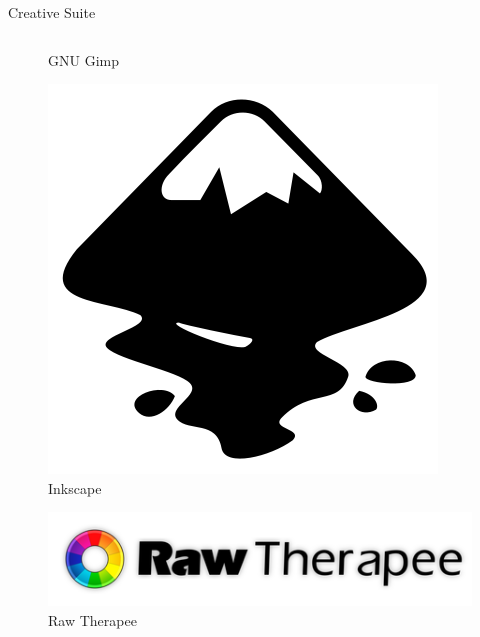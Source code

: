 \documentclass[10pt]{beamer}
\begin{document}
\begin{frame}{Creative Suite}
\begin{columns}
\begin{column}{0.5\textwidth}
\begin{figure}
                    \caption{GNU Gimp}
                \end{figure}
                \begin{figure}
                    \includegraphics[height=0.12\paperheight]{images/inkscape}
                    \caption{Inkscape}
                \end{figure}
                \begin{figure}
                    \includegraphics[height=0.12\paperheight]{images/rawtherapy}
                    \caption{Raw Therapee}
                \end{figure}
            \end{column}
        \end{columns}
    \end{frame}
\end{document}
